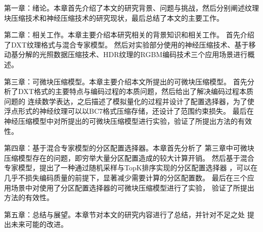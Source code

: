 第一章：绪论。本章首先介绍了本文的研究背景、问题与挑战，然后分别阐述纹理
块压缩技术和神经压缩技术的研究现状，最后总结了本文的主要工作。

第二章：相关工作。本章主要介绍本研究相关的背景知识和相关工作。
首先介绍了DXT纹理格式与混合专家模型。
然后对实验部分使用的神经压缩技术、基于移动基分解的光照数据压缩技术、HDR纹理的RGBM编码技术三个应用场景进行概述。

第三章：可微块压缩模型。本章主要介绍本文所提出的可微块压缩模型。
首先分析了DXT格式的主要特点与编码过程的本质问题，然后给出了解决编码过程本质问题的
连续数学表达，之后描述了模拟量化的过程并设计了配置选择器，为了使
浮点形式的神经纹理可以以BC7格式压缩存储，还设计了范围约束损失。
最后在神经压缩模型中对所提出的可微块压缩模型进行实验，验证了所提出方法的有效性。

第四章：基于混合专家模型的分区配置选择器。本章首先分析了
第三章中可微块压缩模型存在的问题，即穷举大量分区配置造成的较大计算开销。
然后基于混合专家模型，提出了一种通过随机采样与TopK排序实现的分区配置选择器
，可以在几乎不损失编码质量的前提下，显著减少需要计算的分区配置数。
最后在三个应用场景中对使用了分区配置选择器的可微块压缩模型进行了实验，
验证了所提出方法的有效性。

第五章：总结与展望。本章节对本文的研究内容进行了总结，并针对不足之处
提出未来可能的改进。

